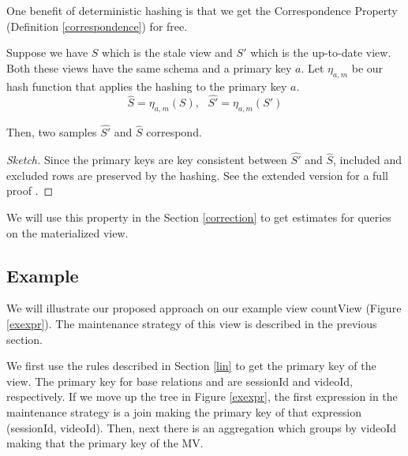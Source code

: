 One benefit of deterministic hashing is that we get the Correspondence Property (Definition \ref{correspondence}) for free.
\begin{theorem}
Suppose we have $S$ which is the stale view and $S'$ which is the up-to-date view.
Both these views have the same schema and a primary key $a$.
Let $\eta_{a, m}$ be our hash function that applies the hashing to the primary key $a$.
\[
\hat{S} = \eta_{a, m}(S),\text{ } \hat{S'} = \eta_{a, m}(S')
\]

Then, two samples $\hat{S'}$ and $\hat{S}$ correspond.
\end{theorem}
\begin{proof}[Sketch]
Since the primary keys are key consistent between $\hat{S'}$ and $\hat{S}$, included and excluded rows are preserved by the hashing.
See the extended version for a full proof \cite{technicalReport}.

\end{proof}
We will use this property in the Section \ref{correction} to get estimates for queries on the materialized view.

\subsection{Example}
We will illustrate our proposed approach on our example view \textsf{countView} (Figure \ref{exexpr}).
The maintenance strategy of this view is described in the previous section.

We first use the rules described in Section \ref{lin} to get the primary key of the view.  
The primary key for base relations  and  are \textsf{sessionId} and \textsf{videoId}, respectively.
If we move up the tree in Figure \ref{exexpr}, the first expression in the maintenance strategy is a join making the primary key of that expression (\textsf{sessionId}, \textsf{videoId}).
Then, next there is an aggregation which groups by \textsf{videoId} making that the primary key of the MV.


